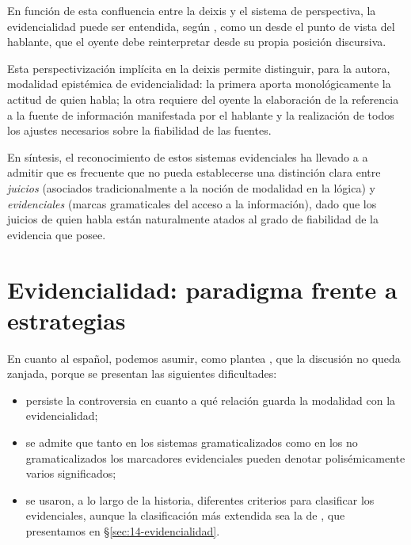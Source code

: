 \begin{destacado}
En función de esta confluencia entre la deixis y el sistema de perspectiva, la
evidencialidad puede ser entendida, según \textcite{hassler2010}, como un
 desde el punto de vista del
hablante, que el oyente debe reinterpretar desde su propia posición discursiva.
\end{destacado}

Esta perspectivización implícita en la deixis permite distinguir, para la
autora, modalidad epistémica de evidencialidad: la primera aporta
monológicamente la actitud de quien habla; la otra requiere del oyente la
elaboración de la referencia a la fuente de información manifestada por el
hablante y la realización de todos los ajustes necesarios sobre la fiabilidad de
las fuentes.

En síntesis, el reconocimiento de estos sistemas evidenciales ha llevado a
\textcite{palmer1986} a admitir que es frecuente que no pueda establecerse una
distinción clara entre \textit{juicios} (asociados tradicionalmente a la noción
de modalidad en la lógica) y \textit{evidenciales} (marcas gramaticales del
acceso a la información), dado que los juicios de quien habla están naturalmente
atados al grado de fiabilidad de la evidencia que posee.

\section{Evidencialidad: paradigma frente a estrategias}\label{sec:14-estrategias}

En cuanto al español, podemos asumir, como plantea
\textcite{gonzalezvazquez2016}, que la discusión no queda zanjada, porque se
presentan las siguientes dificultades:

\begin{itemize}
  \item persiste la controversia en cuanto a qué relación guarda la modalidad con
        la evidencialidad;
  \item se admite que tanto en los sistemas gramaticalizados como en los no
        gramaticalizados los marcadores evidenciales pueden denotar
        polisémicamente varios significados;
  \item se usaron, a lo largo de la historia, diferentes criterios para
        clasificar los evidenciales, aunque la clasificación más extendida sea la
        de \textcite{willett1988}, que presentamos en
        §\ref{sec:14-evidencialidad}.
\end{itemize}

